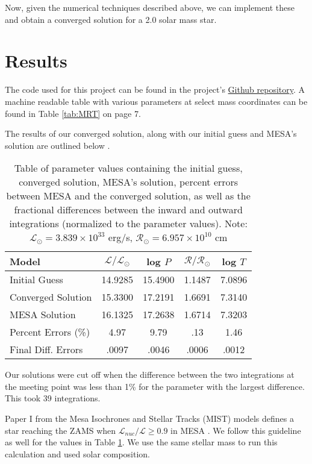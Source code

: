 \documentclass[twocolumn]{aastex631}
\begin{document}
Now, given the numerical techniques described above, we can implement these and obtain a converged solution for a 2.0 solar mass star.

\section{Results}

The code used for this project can be found in the project's \href{https://github.com/pmccreery/ZAMS-code}{Github repository}. A machine readable table with various parameters at select mass coordinates can be found in Table \ref{tab:MRT} on page 7.

The results of our converged solution, along with our initial guess and MESA's solution are outlined below \citep{mesa}.
\begin{table}[ht!]
\centering
\begin{tabular}{ | l | c | c | c | c | }
\hline
Model & $\mathcal{L}/\mathcal{L}_\odot$ & log $P$ & $\mathcal{R}/\mathcal{R}_\odot$ & log $T$ \\
\hline
Initial Guess & 14.9285 & 15.4900 & 1.1487 & 7.0896 \\
\hline
Converged Solution & 15.3300 & 17.2191 & 1.6691 & 7.3140 \\
\hline
MESA Solution & 16.1325 & 17.2638 & 1.6714 & 7.3203 \\
\hline
Percent Errors (\%) & 4.97 & 9.79 & .13 & 1.46 \\
\hline
Final Diff. Errors & .0097 & .0046 & .0006 & .0012 \\
\hline
\end{tabular}
\caption{Table of parameter values containing the initial guess, converged solution, MESA's solution, percent errors between MESA and the converged solution, as well as the fractional differences between the inward and outward integrations (normalized to the parameter values). Note: $\mathcal{L}_\odot = 3.839\times 10^{33} $ erg/s, $\mathcal{R}_\odot = 6.957\times 10^{10} $ cm}
\label{tab:res}
\end{table}


Our solutions were cut off when the difference between the two integrations at the meeting point was less than 1\% for the parameter with the largest difference. This took 39 integrations.

Paper I from the Mesa Isochrones and Stellar Tracks (MIST) models defines a star reaching the ZAMS when $\mathcal{L}_{nuc}/\mathcal{L} \geq 0.9$ in MESA \citep{mist}. We follow this guideline as well for the values in Table \ref{tab:res}. We use the same stellar mass to run this calculation and used solar composition.
\end{document}
